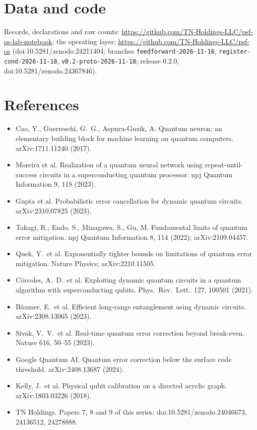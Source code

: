 \documentclass[10pt,a4paper]{article}
\begin{document}
\section*{Data and code}
Records, declarations and raw counts: \url{https://github.com/TN-Holdings-LLC/psf-os-lab-notebook}; the operating
layer: \url{https://github.com/TN-Holdings-LLC/psf-os} (doi:10.5281/zenodo.24211404; branches
\texttt{feedforward-2026-11-16}, \texttt{register-cond-2026-11-18}, \texttt{v0.2-proto-2026-11-18}; release 0.2.0,
doi:10.5281/zenodo.24367846).

\section*{References}
\begin{itemize}
\item Cao, Y., Guerreschi, G.\ G., Aspuru-Guzik, A. Quantum neuron: an elementary building block for machine learning on
quantum computers. arXiv:1711.11240 (2017).
\item Moreira et al. Realization of a quantum neural network using repeat-until-success circuits in a
superconducting quantum processor. npj Quantum Information 9, 118 (2023).
\item Gupta et al. Probabilistic error cancellation for dynamic quantum circuits. arXiv:2310.07825 (2023).
\item Takagi, R., Endo, S., Minagawa, S., Gu, M. Fundamental limits of quantum error mitigation. npj Quantum Information 8,
114 (2022); arXiv:2109.04457.
\item Quek, Y.\ et al. Exponentially tighter bounds on limitations of quantum error mitigation. Nature Physics;
arXiv:2210.11505.
\item C\'orcoles, A.\ D.\ et al. Exploiting dynamic quantum circuits in a quantum algorithm with superconducting qubits.
Phys.\ Rev.\ Lett.\ 127, 100501 (2021).
\item B\"aumer, E.\ et al. Efficient long-range entanglement using dynamic circuits. arXiv:2308.13065 (2023).
\item Sivak, V.\ V.\ et al. Real-time quantum error correction beyond break-even. Nature 616, 50--55 (2023).
\item Google Quantum AI. Quantum error correction below the surface code threshold. arXiv:2408.13687 (2024).
\item Kelly, J.\ et al. Physical qubit calibration on a directed acyclic graph. arXiv:1803.03226 (2018).
\item TN Holdings. Papers 7, 8 and 9 of this series: doi:10.5281/zenodo.24046673, 24136512, 24278888.
\end{itemize}
\end{document}
